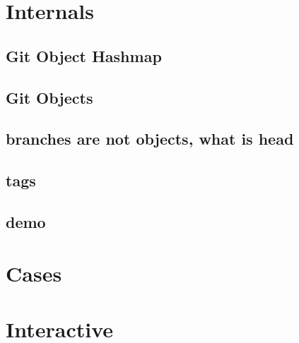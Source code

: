 \begin{frame}
 \titlepage
\end{frame}

\section{Internals}

	\subsection{Git Object Hashmap}
	

	\subsection{Git Objects}
	

	\subsection{branches are not objects, what is head}
	

	\subsection{tags}
	

	\subsection{demo}
	


\section{Cases}

	
	

\section{Interactive}

